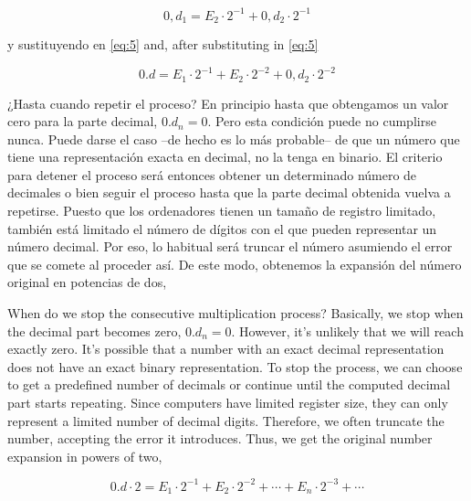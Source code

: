 \begin{equation}
0,d_1=E_2\cdot 2^{-1}+0,d_2\cdot 2^{-1}
\end{equation}  
\begin{paracol}{2}
y sustituyendo en \ref{eq:5}
\switchcolumn
and, after substituting in \ref{eq:5}
\end{paracol}
\begin{equation}
0.d=E_1\cdot 2^{-1}+E_2\cdot 2^{-2}+0,d_2\cdot 2^{-2}
\end{equation}
\begin{paracol}{2}
¿Hasta cuando repetir el proceso? En principio hasta que obtengamos un valor cero para la parte decimal, $0.d_n=0$. Pero esta condición puede no cumplirse nunca. Puede darse el caso --de hecho es lo más probable-- de que un número que tiene una representación exacta en decimal, no la tenga en binario. El criterio para detener el proceso será entonces obtener un determinado número de decimales o bien seguir el proceso hasta que la parte decimal obtenida vuelva a repetirse. Puesto que los ordenadores tienen un tamaño de registro limitado, también está limitado el número de dígitos con el que pueden representar un número decimal. Por eso, lo habitual será truncar el número asumiendo el error que se comete al proceder así.  De este modo, obtenemos la expansión del número original en potencias de dos,

\switchcolumn
When do we stop the consecutive multiplication process? Basically, we stop when the decimal part becomes zero, $0.d_n = 0.$ However, it's unlikely that we will reach exactly zero. It's possible that a number with an exact decimal representation does not have an exact binary representation. To stop the process, we can choose to get a predefined number of decimals or continue until the computed decimal part starts repeating. Since computers have limited register size, they can only represent a limited number of decimal digits. Therefore, we often truncate the number, accepting the error it introduces. Thus, we get the original number expansion in powers of two,    
\end{paracol}
\begin{equation}
0.d\cdot 2=E_1\cdot 2^{-1}+E_2\cdot 2^{-2}+\cdots+ E_n\cdot 2^{-3}+\cdots
\end{equation} 
